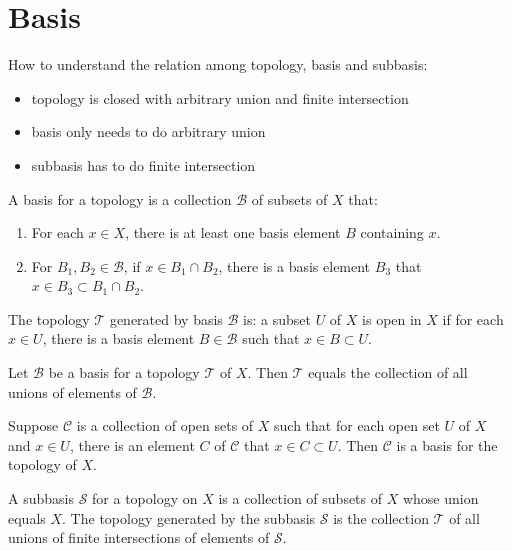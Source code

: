\section{Basis}



How to understand the relation among topology, basis and subbasis:
\begin{itemize}
    \item topology is closed with arbitrary union and finite intersection
    \item basis only needs to do arbitrary union
    \item subbasis has to do finite intersection
\end{itemize}



\begin{definition}
    A basis for a topology is a collection $\mathcal{B}$ of subsets of $X$ that:
    \begin{enumerate}
        \item For each $x \in X$, there is at least one basis element $B$ containing $x$.
        \item For $B_1, B_2 \in \mathcal{B}$, if $x \in B_1 \cap B_2$, there is a basis element $B_3$ that $x \in B_3 \subset B_1 \cap B_2$.
    \end{enumerate}
\end{definition}

The topology $\mathcal{T}$ generated by basis $\mathcal{B}$ is: a subset $U$ of $X$ is open in $X$ if for each $x \in U$, there is a basis element $B \in \mathcal{B}$ such that $x \in B \subset U$.




\begin{theorem}
    Let $\mathcal{B}$ be a basis for a topology $\mathcal{T}$ of $X$. Then $\mathcal{T}$ equals the collection of all unions of elements of $\mathcal{B}$.
\end{theorem}



\begin{theorem}
    Suppose $\mathcal{C}$ is a collection of open sets of $X$ such that for each open set $U$ of $X$ and $x \in U$, there is an element $C$ of $\mathcal{C}$ that $x \in C \subset U$. Then $\mathcal{C}$ is a basis for the topology of $X$.    
\end{theorem}


\begin{definition}
    A subbasis $\mathcal{S}$ for a topology on $X$ is a collection of subsets of $X$ whose union equals $X$. The topology generated by the subbasis $\mathcal{S}$ is the collection $\mathcal{T}$ of all unions of finite intersections of elements of $\mathcal{S}$.
\end{definition}



